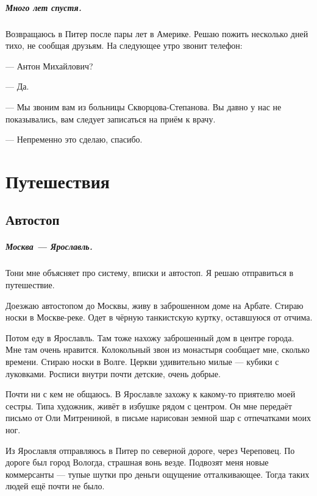 \documentclass{book}
\begin{document}
\paragraph{Много лет спустя.}
Возвращаюсь в Питер после пары лет в Америке.
Решаю пожить несколько дней тихо, не сообщая друзьям.
На следующее утро звонит телефон:

--- Антон Михайлович?

--- Да.

--- Мы звоним вам из больницы Скворцова-Степанова. Вы давно у нас не показывались, вам следует записаться на приём к врачу.

--- Непременно это сделаю, спасибо.

\chapter*{Путешествия}

\section*{Автостоп}

\paragraph{Москва --- Ярославль.}
Тони мне объясняет про систему, вписки и автостоп.
Я решаю отправиться в путешествие.

Доезжаю автостопом до Москвы, живу в заброшенном доме на Арбате.
Стираю носки в Москве-реке.
Одет в чёрную танкистскую куртку, оставшуюся от отчима.

Потом еду в Ярославль.
Там тоже нахожу заброшенный дом в центре города.
Мне там очень нравится.
Колокольный звон из монастыря сообщает мне, сколько времени.
Стираю носки в Волге.
Церкви удивительно милые --- кубики с луковками.
Росписи внутри почти детские, очень добрые.

Почти ни с кем не общаюсь.
В Ярославле захожу к какому-то приятелю моей сестры.
Типа художник, живёт в избушке рядом с центром.
Он мне передаёт письмо от Оли Митрениной, в письме нарисован земной шар с отпечатками моих ног.

Из Ярославля отправляюсь в Питер по северной дороге, 
через Череповец.
По дороге был город Вологда, страшная вонь везде.
Подвозят меня новые коммерсанты ---
тупые шутки про деньги
ощущение отталкивающее.
Тогда таких людей ещё почти не было.
\end{document}
